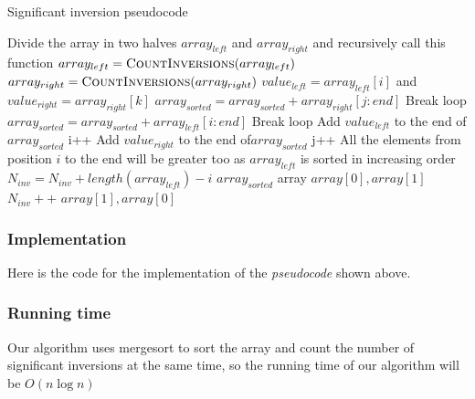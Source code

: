 \documentclass{article}
\begin{document}
\begin{algorithm}[H]
\caption{Significant inversion pseudocode}
\begin{algorithmic}[1]
  \State Divide the array in two halves $array_{left}$ and $array_{right}$ and
  \State recursively call this function
  \State $array_{left} = \Call{CountInversions}{array_{left}}$
  \State $array_{right} = \Call{CountInversions}{array_{right}}$
   \State $value_{left}  = array_{left}[i]$ and $value_{right} = array_{right}[k]$
    \State $array_{sorted} = array_{sorted} + array_{right}[j:end]$
    \State Break loop
    \State $array_{sorted} = array_{sorted} + array_{left}[i:end]$
    \State Break loop
   \EndIf
    \State Add $value_{left}$ to the end of$array_{sorted}$
    \State i++
   \Else
    \State Add $value_{right}$ to the end of$array_{sorted}$
    \State j++
     \State All the elements from position $i$ to the end will be greater
     \State too as $array_{left}$ is sorted in increasing order
     \State $N_{inv} = N_{inv} + length(array_{left}) - i$
    \EndIf
   \EndIf
  \EndWhile
  \State \Return $array_{sorted}$
 \EndIf
  \State \Return array
 \ElsIf
   \State \Return $array[0],array[1]$
  \Else
    \State $N_{inv}++$
   \EndIf
   \State \Return $array[1],array[0]$
  \EndIf
 \EndIf
\EndFunction
\end{algorithmic}
\end{algorithm}

\subsubsection*{Implementation}

Here is the code for the implementation of the \textit{pseudocode} shown above.



\subsubsection*{Running time}

Our algorithm uses mergesort to sort the array and count the number of significant inversions at the same time, so the running time of our algorithm will be $O(n\log n)$
\end{document}
